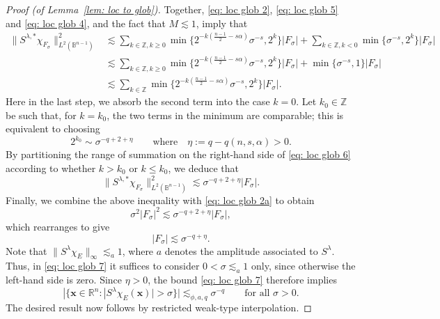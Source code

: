 \documentclass[reqno]{amsart}
\numberwithin{equation}{section}
\newcommand{\B}{\mathbb{B}}
\newcommand{\R}{\mathbb{R}}
\newcommand{\Z}{\mathbb{Z}}
\newcommand{\bx}{\mathbf{x}}
\theoremstyle{plain}
\theoremstyle{definition}
\begin{document}
\begin{proof}[Proof (of Lemma~\ref{lem: loc to glob})]
Together, \eqref{eq: loc glob 2}, \eqref{eq: loc glob 5} and \eqref{eq: loc glob 4}, and the fact that $M \lesssim 1$, imply that
\begin{equation}\label{eq: loc glob 6}
\begin{split}
     \|S^{\lambda, *}\chi_{F_{\sigma}}\|_{L^2(\B^{n-1})}^2 &\lesssim  \sum_{k \in \Z,k\ge 0} \min\{2^{-k(\frac{n-1}{2} - s\alpha)} \sigma^{-s}, 2^k\} |F_{\sigma}|+\sum_{k \in \Z,k<0} \min\{ \sigma^{-s}, 2^k\} |F_{\sigma}|\\
     &\lesssim  \sum_{k \in \Z,k\ge 0} \min\{2^{-k(\frac{n-1}{2} - s\alpha)} \sigma^{-s}, 2^k\} |F_{\sigma}|+\min\{ \sigma^{-s}, 1\} |F_{\sigma}|\\
     &\lesssim  \sum_{k \in \Z} \min\{2^{-k(\frac{n-1}{2} - s\alpha)} \sigma^{-s}, 2^k\} |F_{\sigma}|.
\end{split}
\end{equation}
Here in the last step, we absorb the second term into the case $k=0$.
Let $k_0 \in \Z$ be such that, for $k = k_0$, the two terms in the minimum are comparable; this is equivalent to choosing
\begin{equation*}
    2^{k_0} \sim \sigma^{-q + 2 + \eta} \qquad \textrm{where} \quad \eta := q - q(n, s, \alpha) > 0.
\end{equation*}
By partitioning the range of summation on the right-hand side of \eqref{eq: loc glob 6} according to whether $k > k_0$ or $k \leq k_0$, we deduce that
\begin{equation*}
    \|S^{\lambda, *}\chi_{F_{\sigma}}\|_{L^2(\B^{n-1})}^2 \lesssim \sigma^{-q + 2 + \eta} |F_{\sigma}|.
\end{equation*}
Finally, we combine the above inequality with \eqref{eq: loc glob 2a} to obtain
\begin{equation*}
  \sigma^2 |F_{\sigma}|^2 \lesssim  \sigma^{-q + 2 + \eta} |F_{\sigma}|,
\end{equation*}
which rearranges to give 
\begin{equation}\label{eq: loc glob 7}
|F_{\sigma}| \lesssim  \sigma^{-q + \eta}.    
\end{equation}
 Note that $\|S^{\lambda}\chi_E\|_{\infty} \lesssim_a 1$, where $a$ denotes the amplitude associated to $S^{\lambda}$. Thus, in \eqref{eq: loc glob 7} it suffices to consider $0 < \sigma \lesssim_a 1$ only, since otherwise the left-hand side is zero. Since $\eta > 0$, the bound \eqref{eq: loc glob 7} therefore implies
\begin{equation*}
   |\{\bx \in \R^n : |S^{\lambda}\chi_E(\bx)|  > \sigma \}|\lesssim_{\phi, a, q} \sigma^{-q} \qquad \textrm{for all $\sigma > 0$.}
\end{equation*}
The desired result now follows by restricted weak-type interpolation. 
\end{proof}
\end{document}
